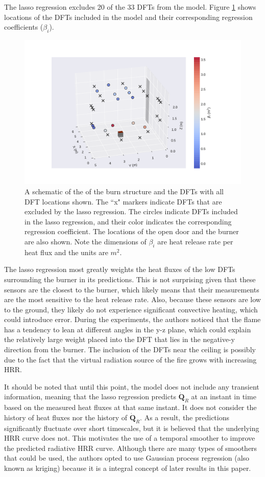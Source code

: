 \documentclass{article}
\begin{document}
The lasso regression excludes 20 of the 33 DFTs from the model. Figure \ref{fig:lasso_dfts} shows locations of the DFTs included in the model and their corresponding regression coefficients ($\beta_i$).

\begin{figure}[htb] \centering
\includegraphics[width=.75\textwidth]{./figures/lasso_dfts.pdf}
\caption{A schematic of the of the burn structure and the DFTs with all DFT locations shown. The ``x" markers indicate DFTs that are excluded by the lasso regression. The circles indicate DFTs included in the lasso regression, and their color indicates the corresponding regression coefficient. The locations of the open door and the burner are also shown. Note the dimensions of $\beta_i$ are heat release rate per heat flux and the units are $m^2$.}
\label{fig:lasso_dfts}
\end{figure}

The lasso regression most greatly weights the heat fluxes of the low DFTs surrounding the burner in its predictions. This is not surprising given that these sensors are the closest to the burner, which likely means that their measurements are the most sensitive to the heat release rate. Also, because these sensors are low to the ground, they likely do not experience significant convective heating, which could introduce error. During the experiments, the authors noticed that the flame has a tendency to lean at different angles in the y-z plane, which could explain the relatively large weight placed into the DFT that lies in the negative-y direction from the burner. The inclusion of the DFTs near the ceiling is possibly due to the fact that the virtual radiation source of the fire grows with increasing HRR.

It should be noted that until this point, the model does not include any transient information, meaning that the lasso regression predicts $\boldsymbol{\dot{Q}}_{R}$ at an instant in time based on the measured heat fluxes at that same instant. It does not consider the history of heat fluxes nor the history of $\boldsymbol{\dot{Q}}_{R}$. As a result, the predictions significantly fluctuate over short timescales, but it is believed that the underlying HRR curve does not. This motivates the use of a temporal smoother to improve the predicted radiative HRR curve. Although there are many types of smoothers that could be used, the authors opted to use Gaussian process regression (also known as kriging) because it is a integral concept of later results in this paper. 
\end{document}
